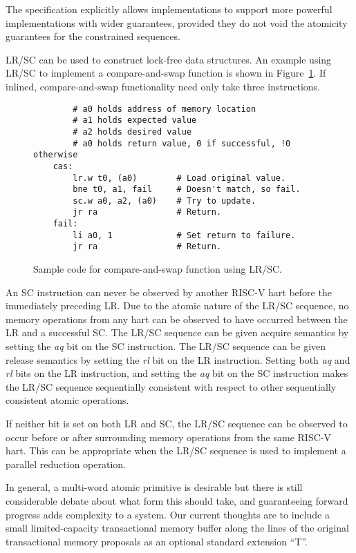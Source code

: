 \begin{commentary}
The specification explicitly allows implementations to support more
powerful implementations with wider guarantees, provided they do not
void the atomicity guarantees for the constrained sequences.
\end{commentary}

LR/SC can be used to construct lock-free data structures.  An example
using LR/SC to implement a compare-and-swap function is shown in
Figure~\ref{cas}.  If inlined, compare-and-swap functionality need
only take three instructions.

\begin{figure}[h!]
\begin{center}
\begin{verbatim}
        # a0 holds address of memory location 
        # a1 holds expected value
        # a2 holds desired value
        # a0 holds return value, 0 if successful, !0 otherwise
    cas:
        lr.w t0, (a0)        # Load original value.
        bne t0, a1, fail     # Doesn't match, so fail.
        sc.w a0, a2, (a0)    # Try to update.
        jr ra                # Return.
    fail:
        li a0, 1             # Set return to failure.
        jr ra                # Return.
\end{verbatim}
\end{center}
\caption{Sample code for compare-and-swap function using LR/SC.}
\label{cas}
\end{figure}

An SC instruction can never be observed by another RISC-V hart
before the immediately preceding LR.  Due to the atomic nature of the
LR/SC sequence, no memory operations from any hart can be observed
to have occurred between the LR and a successful SC.  The LR/SC
sequence can be given acquire semantics by setting the {\em aq} bit on
the SC instruction.  The LR/SC sequence can be given release semantics
by setting the {\em rl} bit on the LR instruction.  Setting both {\em
  aq} and {\em rl} bits on the LR instruction, and setting the {\em
  aq} bit on the SC instruction makes the LR/SC sequence sequentially
consistent with respect to other sequentially consistent atomic
operations.

If neither bit is set on both LR and SC, the LR/SC sequence can be
observed to occur before or after surrounding memory operations from
the same RISC-V hart.  This can be appropriate when the LR/SC
sequence is used to implement a parallel reduction operation.

\begin{commentary}
In general, a multi-word atomic primitive is desirable but there is
still considerable debate about what form this should take, and
guaranteeing forward progress adds complexity to a system.  Our
current thoughts are to include a small limited-capacity transactional
memory buffer along the lines of the original transactional memory
proposals as an optional standard extension ``T''.
\end{commentary}


